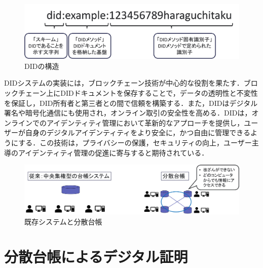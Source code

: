 \documentclass[11pt,dvipdfmx]{jreport}
\begin{document}
\begin{figure}[t]
  \centering
  \includegraphics[width=1.0\linewidth]{Haraguchi_fig/DID.pdf}
  \caption{DIDの構造}
  \label{fig:did}
\end{figure}

DIDシステムの実装には，ブロックチェーン技術が中心的な役割を果たす．ブロックチェーン上にDIDドキュメントを保存することで，データの透明性と不変性を保証し，DID所有者と第三者との間で信頼を構築する．また，DIDはデジタル署名や暗号化通信にも使用され，オンライン取引の安全性を高める．DIDは，オンラインでのアイデンティティ管理において革新的なアプローチを提供し，ユーザーが自身のデジタルアイデンティティをより安全に，かつ自由に管理できるようにする．この技術は，プライバシーの保護，セキュリティの向上，ユーザー主導のアイデンティティ管理の促進に寄与すると期待されている．

\begin{figure}[t]
  \centering
  \includegraphics[width=1.0\linewidth]{Haraguchi_fig/bunnsan.pdf}
  \caption{既存システムと分散台帳}
  \label{fig:bunnsan}
\end{figure}


\section{分散台帳によるデジタル証明}
\end{document}
